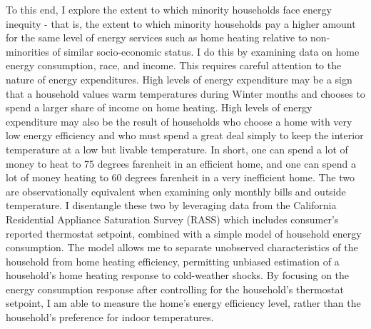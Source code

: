 \documentclass[
]{article}
\begin{document}
To this end, I explore the extent to which minority households face
energy inequity - that is, the extent to which minority households pay a
higher amount for the same level of energy services such as home heating
relative to non-minorities of similar socio-economic status. I do this
by examining data on home energy consumption, race, and income. This
requires careful attention to the nature of energy expenditures. High
levels of energy expenditure may be a sign that a household values warm
temperatures during Winter months and chooses to spend a larger share of
income on home heating. High levels of energy expenditure may also be
the result of households who choose a home with very low energy
efficiency and who must spend a great deal simply to keep the interior
temperature at a low but livable temperature. In short, one can spend a
lot of money to heat to 75 degrees farenheit in an efficient home, and
one can spend a lot of money heating to 60 degrees farenheit in a very
inefficient home. The two are observationally equivalent when examining
only monthly bills and outside temperature. I disentangle these two by
leveraging data from the California Residential Appliance Saturation
Survey (RASS) which includes consumer's reported thermostat setpoint,
combined with a simple model of household energy consumption. The model
allows me to separate unobserved characteristics of the household from
home heating efficiency, permitting unbiased estimation of a household's
home heating response to cold-weather shocks. By focusing on the energy
consumption response after controlling for the household's thermostat
setpoint, I am able to measure the home's energy efficiency level,
rather than the household's preference for indoor temperatures.
\end{document}

